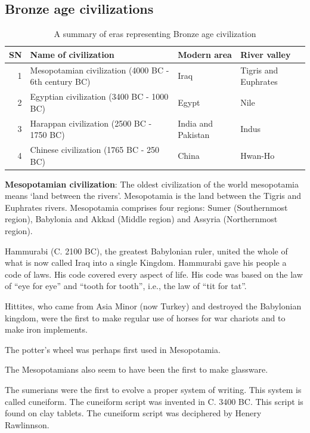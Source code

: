 \documentclass[
  openany]{book}
\begin{document}
\hypertarget{bronze-age-civilizations}{%
\subsection{Bronze age civilizations}\label{bronze-age-civilizations}}

\begin{table}

\caption{\label{tab:bronze-age}A summary of eras representing Bronze age civilization}
\centering
\begin{tabular}[t]{rlll}
\toprule
SN & Name of civilization & Modern area & River valley\\
\midrule
1 & Mesopotamian civilization (4000 BC - 6th century BC) & Iraq & Tigris and Euphrates\\
2 & Egyptian civilization (3400 BC - 1000 BC) & Egypt & Nile\\
3 & Harappan civilization (2500 BC - 1750 BC) & India and Pakistan & Indus\\
4 & Chinese civilization (1765 BC - 250 BC) & China & Hwan-Ho\\
\bottomrule
\end{tabular}
\end{table}

\textbf{Mesopotamian civilization}: The oldest civilization of the world mesopotamia means `land between the rivers'. Mesopotamia is the land between the Tigris and Euphrates rivers. Mesopotamia comprises four regions: Sumer (Southernmost region), Babylonia and Akkad (Middle region) and Assyria (Northernmost region).

Hammurabi (C. 2100 BC), the greatest Babylonian ruler, united the whole of what is now called Iraq into a single Kingdom. Hammurabi gave his people a code of laws. His code covered every aspect of life. His code was based on the law of ``eye for eye'' and ``tooth for tooth'', i.e., the law of ``tit for tat''.

Hittites, who came from Asia Minor (now Turkey) and destroyed the Babylonian kingdom, were the first to make regular use of horses for war chariots and to make iron implements.

The potter's wheel was perhaps first used in Mesopotamia.

The Mesopotamians also seem to have been the first to make glassware.

The sumerians were the first to evolve a proper system of writing. This system is called cuneiform. The cuneiform script was invented in C. 3400 BC. This script is found on clay tablets. The cuneiform script was deciphered by Henery Rawlinnson.
\end{document}

